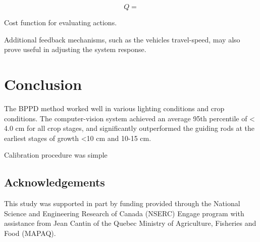 \documentclass[authoryear]{elsarticle}
\begin{document}
\begin{equation}
  Q = 
  \label{eq:qlearning}
\end{equation}
\begin{flushleft}
Cost function for evaluating actions.
\end{flushleft}

Additional feedback mechanisms, such as the vehicles travel-speed, may
also prove useful in adjusting the system response.

\section{Conclusion}
The BPPD method worked well in various lighting conditions and crop conditions.
The computer-vision system achieved an average 95th percentile of <
4.0 cm for all crop stages, and significantly outperformed the guiding
rods at the earliest stages of growth <10 cm and 10-15 cm.

Calibration procedure was simple

\subsection{Acknowledgements}
This study was supported in part by funding provided through the
National Science and Engineering Research of Canada (NSERC) Engage
program with assistance from Jean Cantin of the Quebec Ministry of
Agriculture, Fisheries and Food (MAPAQ).



\end{document}
